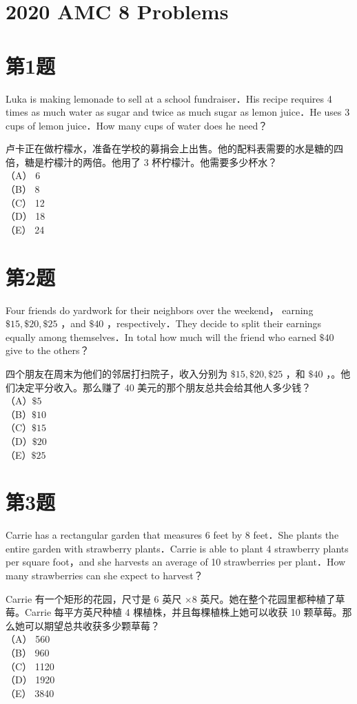 \documentclass[10pt]{article}
\begin{document}
\section*{2020 AMC 8 Problems}
\section*{第1题}
Luka is making lemonade to sell at a school fundraiser．His recipe requires 4 times as much water as sugar and twice as much sugar as lemon juice．He uses 3 cups of lemon juice．How many cups of water does he need？

卢卡正在做柠檬水，准备在学校的募捐会上出售。他的配料表需要的水是糖的四倍，糖是柠檬汁的两倍。他用了 3 杯柠檬汁。他需要多少杯水？\\
（A） 6\\
（B） 8\\
（C） 12\\
（D） 18\\
（E） 24

\section*{第2题}
Four friends do yardwork for their neighbors over the weekend， earning $\$ 15, \$ 20, \$ 25$ ，and $\$ 40$ ，respectively．They decide to split their earnings equally among themselves．In total how much will the friend who earned $\$ 40$ give to the others？

四个朋友在周末为他们的邻居打扫院子，收入分别为 $\$ 15, \$ 20, \$ 25$ ，和 $\$ 40$ ，。他们决定平分收入。那么赚了 40 美元的那个朋友总共会给其他人多少钱？\\
（A）$\$ 5$\\
（B）$\$ 10$\\
（C）$\$ 15$\\
（D）$\$ 20$\\
（E）$\$ 25$

\section*{第3题}
Carrie has a rectangular garden that measures 6 feet by 8 feet．She plants the entire garden with strawberry plants．Carrie is able to plant 4 strawberry plants per square foot，and she harvests an average of 10 strawberries per plant．How many strawberries can she expect to harvest？

Carrie 有一个矩形的花园，尺寸是 6 英尺 $\times 8$ 英尺。她在整个花园里都种植了草莓。Carrie 每平方英尺种植 4 棵植株，并且每棵植株上她可以收获 10 颗草莓。那么她可以期望总共收获多少颗草莓？\\
（A） 560\\
（B） 960\\
（C） 1120\\
（D） 1920\\
（E） 3840
\end{document}

